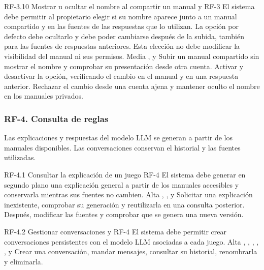\requisitoFuncional
{RF-3.10}
{Mostrar u ocultar el nombre al compartir un manual}
{ y }
{RF-3}
{El sistema debe permitir al propietario elegir si su nombre aparece junto
a un manual compartido y en las fuentes de las respuestas que lo utilizan.
La opción por defecto debe ocultarlo y debe poder cambiarse después de la
subida, también para las fuentes de respuestas anteriores. Esta elección
no debe modificar la visibilidad del manual ni sus permisos.}
{Media}
{,  y }
{Subir un manual compartido sin mostrar el nombre y comprobar su presentación
desde otra cuenta. Activar y desactivar la opción, verificando el cambio
en el manual y en una respuesta anterior. Rechazar el cambio desde una
cuenta ajena y mantener oculto el nombre en los manuales privados.}

\subsubsection{RF-4. Consulta de reglas}

Las explicaciones y respuestas del modelo \ac{LLM} se generan a partir de los manuales disponibles.
Las conversaciones conservan el historial y las fuentes utilizadas.

\requisitoFuncional
{RF-4.1}
{Consultar la explicación de un juego}
{}
{RF-4}
{El sistema debe generar en segundo plano una explicación general a partir de
los manuales accesibles y conservarla mientras sus fuentes no cambien.}
{Alta}
{, ,  y
}
{Solicitar una explicación inexistente, comprobar su generación y reutilizarla
en una consulta posterior. Después, modificar las fuentes y comprobar que se
genera una nueva versión.}

\requisitoFuncional
{RF-4.2}
{Gestionar conversaciones}
{ y }
{RF-4}
{El sistema debe permitir crear conversaciones persistentes con el modelo
\ac{LLM} asociadas a cada juego.
}
{Alta}
{, , ,
, ,  y
}
{Crear una conversación, mandar mensajes, consultar su historial,
renombrarla y eliminarla.}

